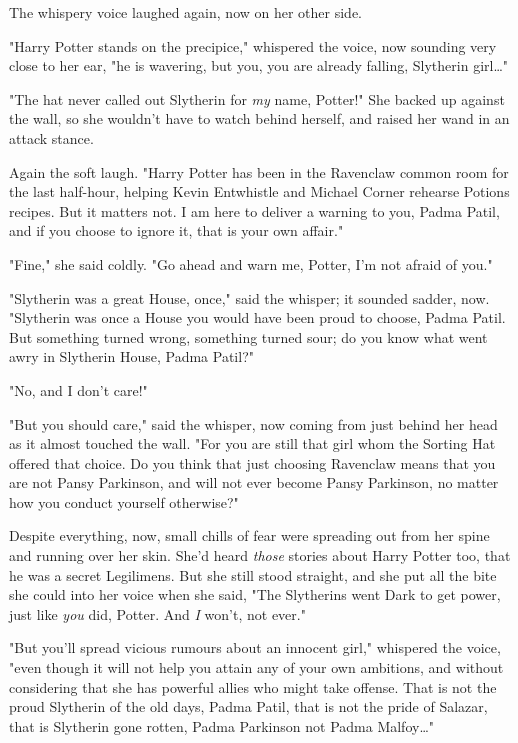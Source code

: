 The whispery voice laughed again, now on her other side.

"Harry Potter stands on the precipice," whispered the voice, now sounding very
close to her ear, "he is wavering, but you, you are already falling, Slytherin
girl…"

"The hat never called out Slytherin for \emph{my} name, Potter!" She backed up
against the wall, so she wouldn’t have to watch behind herself, and raised her
wand in an attack stance.

Again the soft laugh. "Harry Potter has been in the Ravenclaw common room for
the last half-hour, helping Kevin Entwhistle and Michael Corner rehearse
Potions recipes. But it matters not. I am here to deliver a warning to you,
Padma Patil, and if you choose to ignore it, that is your own affair."

"Fine," she said coldly. "Go ahead and warn me, Potter, I’m not afraid of you."

"Slytherin was a great House, once," said the whisper; it sounded sadder, now.
"Slytherin was once a House you would have been proud to choose, Padma Patil.
But something turned wrong, something turned sour; do you know what went awry
in Slytherin House, Padma Patil?"

"No, and I don’t care!"

"But you should care," said the whisper, now coming from
just behind her head as it almost touched the wall. "For you
are still that girl whom the Sorting Hat offered that choice. Do you think that
just choosing Ravenclaw means that you are not Pansy Parkinson, and will not
ever become Pansy Parkinson, no matter how you conduct yourself otherwise?"

Despite everything, now, small chills of fear were spreading out from her spine
and running over her skin. She’d heard \emph{those} stories about Harry Potter
too, that he was a secret Legilimens. But she still stood straight, and she put
all the bite she could into her voice when she said, "The Slytherins went Dark
to get power, just like \emph{you} did, Potter. And \emph{I} won’t, not ever."

"But you’ll spread vicious rumours about an innocent girl," whispered the voice,
"even though it will not help you attain any of your own ambitions, and without
considering that she has powerful allies who might take offense. That is not
the proud Slytherin of the old days, Padma Patil, that is not the pride of
Salazar, that is Slytherin gone rotten, Padma Parkinson not Padma
Malfoy…"

